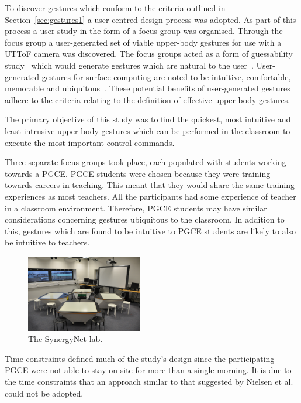 \documentclass[manuscript, review, screen]{acmart}
\begin{document}

To discover gestures which conform to the criteria outlined in Section~\ref{sec:gestures1} a user-centred design process was adopted.
As part of this process a user study in the form of a focus group was organised.
Through the focus group a user-generated set of viable upper-body gestures for use with a \ac{UTToF} camera was discovered.
The focus groups acted as a form of guessability study~\cite{Ruiz2011,Wobbrock2009} which would generate gestures which are natural to the user~\cite{Grandhi2011}.
User-generated gestures for surface computing are noted to be intuitive, comfortable, memorable and ubiquitous~\cite{Bjørneseth2012}.
These potential benefits of user-generated gestures adhere to the criteria relating to the definition of effective upper-body gestures.

The primary objective of this study was to find the quickest, most intuitive and least intrusive upper-body gestures which can be performed in the classroom to execute the most important control commands.

Three separate focus groups took place, each populated with students working towards a \ac{PGCE}.
\ac{PGCE} students were chosen because they were training towards careers in teaching.
This meant that they would share the same training experiences as most teachers.
All the participants had some experience of teacher in a classroom environment.
Therefore, \ac{PGCE} students may have similar considerations concerning gestures ubiquitous to the classroom.
In addition to this, gestures which are found to be intuitive to \ac{PGCE} students are likely to also be intuitive to teachers.

\begin{figure}[h]
   \centering
   \includegraphics[width=0.45\textwidth]{figures/synergynet_lab.png}
   \caption{The SynergyNet lab.}
   \label{fig:synergynetLab}
\end{figure}

Time constraints defined much of the study's design since the participating \ac{PGCE} were not able to stay on-site for more than a single morning.
It is due to the time constraints that an approach similar to that suggested by Nielsen et al.~\citeyearpar{Nielsen2004} could not be adopted.
\end{document}
